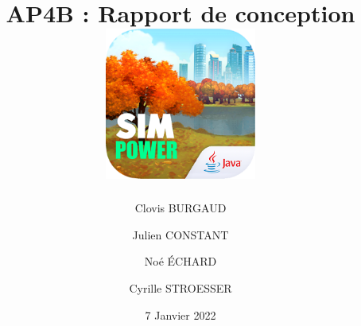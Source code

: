 \documentclass[a4paper, 12pt, titlepage]{article}
\title{
    AP4B : Rapport de conception
    \break\break
    \includegraphics[width=5cm, height=5cm]{images/logo.png}
}
\author{
    Clovis BURGAUD
    \and Julien CONSTANT 
    \and Noé ÉCHARD  
    \and Cyrille STROESSER
}
\date{7 Janvier 2022}
\begin{document}
    
\maketitle



\newpage
\tableofcontents










    
\newpage

\newpage

\nocite{*}
{}


\listoffigures
\end{document}
